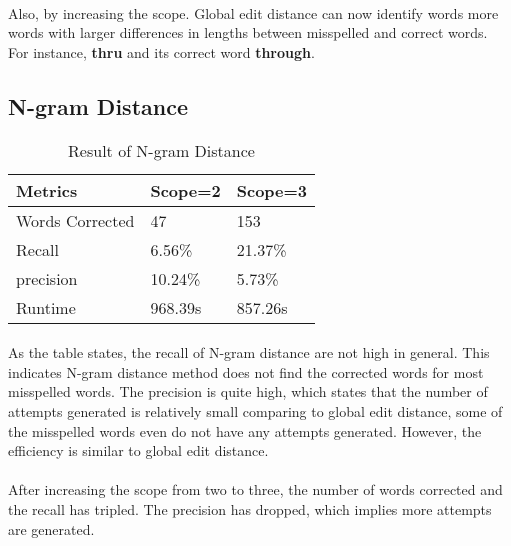 \documentclass[11pt]{article}
\begin{document}
      \paragraph{}
      Also, by increasing the scope. Global edit distance can now identify words more words
      with larger differences in lengths between misspelled and correct words.
      For instance, \textbf{thru} and its correct word \textbf{through}.

  \subsection{N-gram Distance}
    \begin{table}[h]
      \begin{center}
        \begin{tabular}{|l|l|l|}
          \hline
          Metrics & Scope=2 & Scope=3\\
          \hline\hline
          Words Corrected & 47 & 153\\
          \hline
          Recall & 6.56\% & 21.37\%\\
          \hline
          precision & 10.24\% & 5.73\%\\
          \hline
          Runtime & 968.39s & 857.26s\\
          \hline
        \end{tabular}
        \caption{Result of N-gram Distance}\label{table3}
      \end{center}
    \end{table}

    \paragraph{}
    As the table states, the recall of N-gram distance are not high in general.
    This indicates N-gram distance method does not find the corrected words for
    most misspelled words. The precision is quite high, which states that the number
    of attempts generated is relatively small comparing to global edit distance, some
    of the misspelled words even do not have any attempts generated.
    However, the efficiency is similar to global edit distance.
    \paragraph{}
    After increasing the scope from two to three, the number of words corrected
    and the recall has tripled. The precision has dropped, which implies more
    attempts are generated.
\end{document}
